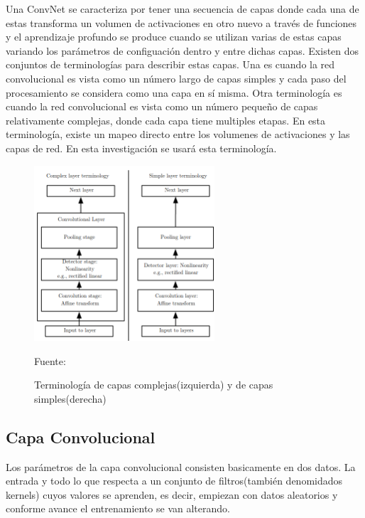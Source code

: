 	Una ConvNet se caracteriza por tener una secuencia de capas donde cada una de estas transforma un volumen de activaciones en otro nuevo a través de funciones y el aprendizaje profundo se produce cuando se utilizan varias de estas capas variando los parámetros de configuación dentro y entre dichas capas. 
	\vskip 0.4cm  
	Existen dos conjuntos de terminologías para describir estas capas. Una es cuando la red convolucional es vista como un número largo de capas simples y cada paso del procesamiento se considera como una capa en sí misma. Otra terminología es cuando la red convolucional es vista como un número pequeño de capas relativamente complejas, donde cada capa tiene multiples etapas. En esta terminología, existe un mapeo directo entre los volumenes de activaciones y las capas de red. En esta investigación se usará esta terminología.

	
	\begin{figure}[H]
	\begin{center}
	\includegraphics[width=0.6\textwidth]{images/marcoteorico/types}
	\end{center}
	\begin{center}
	\caption{\small{Terminología de capas complejas(izquierda) y de capas simples(derecha)}}
	{\small{Fuente: \citep{Goodfellow-et-al-2016}}}
	\end{center}
	\vspace{-1.5em}
	\end{figure}
	
	\subsection{Capa Convolucional}

		Los parámetros de la capa convolucional consisten basicamente en dos datos. La entrada y todo lo que respecta a un conjunto de filtros(también denomidados kernels) cuyos valores se aprenden, es decir, empiezan con datos aleatorios y conforme avance el entrenamiento se van alterando. 
		\vskip 0.3cm 
